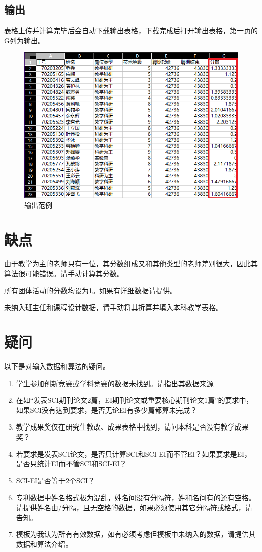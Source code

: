 \documentclass[UTF8,fontset=windowsnew]{ctexart}
\begin{document}
\subsection{输出}
表格上传并计算完毕后会自动下载输出表格，下载完成后打开输出表格，第一页的G列为输出。\par
\begin{figure}[h]
  \centering
  \includegraphics[width=.5\textwidth]{image/output.png}
  \caption{输出范例}
  \label{fig:output}
\end{figure}
\section{缺点}
由于教学为主的老师只有一位，其分数组成又和其他类型的老师差别很大，因此其算法很可能错误。请手动计算其分数。\par
所有团体活动的分数均设为1。如果有详细数据请提供。\par
未纳入班主任和课程设计数据，请手动将其折算并填入本科教学表格。\par
\section{疑问}
以下是对输入数据和算法的疑问。
\begin{enumerate}
  \item 学生参加创新竞赛或学科竞赛的数据未找到。请指出其数据来源
  \item 在如``发表SCI期刊论文2篇，EI期刊论文或重要核心期刊论文1篇''的要求中，如果SCI没有达到要求，是否无论EI有多少篇都算未完成？
  \item 教学成果奖仅在研究生教改、成果表格中找到，请问本科是否没有教学成果奖？
  \item 若要求是发表SCI论文，是否只计算SCI和SCI-EI而不管EI？如果要求是EI，是否只统计EI而不管SCI和SCI-EI？
  \item SCI-EI是否等于2个SCI？
  \item 专利数据中姓名格式极为混乱，姓名间没有分隔符，姓和名间有的还有空格。请提供姓名由/分隔，且无空格的数据，如果必须使用其它分隔符或格式，请告知。
  \item 模板为我认为所有有效数据，如有必须考虑但模板中未纳入的数据，请提供其数据和算法介绍。
\end{enumerate}
\end{document}
